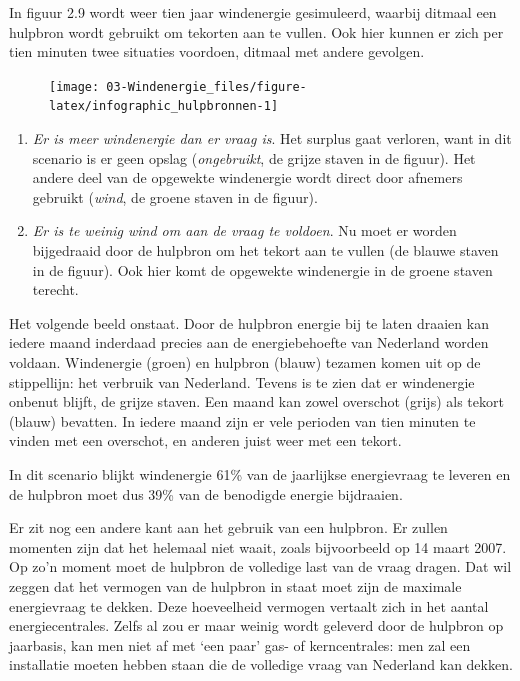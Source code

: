 \documentclass[
  11pt,
  a4paper,
]{book}
\providecommand{\tightlist}{%
  \setlength{\itemsep}{0pt}\setlength{\parskip}{0pt}}
\begin{document}
In figuur 2.9 wordt weer tien jaar windenergie gesimuleerd, waarbij ditmaal een hulpbron wordt gebruikt om tekorten aan te vullen. Ook hier kunnen er zich per tien minuten twee situaties voordoen, ditmaal met andere gevolgen.

\begin{figure}[!t]

{\centering \texttt{[image: 03-Windenergie\_files/figure-latex/infographic\_hulpbronnen-1]} 

}

\end{figure}

\begin{enumerate}
\def\labelenumi{\arabic{enumi}.}
\tightlist
\item
  \emph{Er is meer windenergie dan er vraag is}. Het surplus gaat verloren,
  want in dit scenario is er geen opslag (\emph{ongebruikt}, de grijze staven in de figuur). Het andere
  deel van de opgewekte windenergie wordt direct door afnemers gebruikt (\emph{wind}, de groene staven in de
  figuur).
\item
  \emph{Er is te weinig wind om aan de vraag te voldoen}. Nu moet er worden
  bijgedraaid door de hulpbron om het tekort aan te vullen (de
  blauwe staven in de figuur). Ook hier komt de opgewekte
  windenergie in de groene staven terecht.
\end{enumerate}

\noindent Het volgende beeld onstaat. Door de hulpbron energie bij te laten draaien kan iedere maand inderdaad precies aan de energiebehoefte van Nederland worden voldaan. Windenergie (groen) en hulpbron (blauw) tezamen komen uit op de stippellijn: het verbruik van Nederland. Tevens is te zien dat er windenergie onbenut blijft, de grijze staven. Een maand kan zowel overschot (grijs) als tekort (blauw) bevatten. In iedere maand zijn er vele perioden van tien minuten te vinden met een overschot, en anderen juist weer met een tekort.

In dit scenario blijkt windenergie 61\% van de jaarlijkse energievraag te leveren en de hulpbron moet dus 39\% van de benodigde energie bijdraaien.

Er zit nog een andere kant aan het gebruik van een hulpbron. Er zullen momenten zijn dat het helemaal niet waait, zoals bijvoorbeeld op 14 maart 2007. Op zo'n moment moet de hulpbron de volledige last van de vraag dragen. Dat wil zeggen dat het vermogen van de hulpbron in staat moet zijn de maximale energievraag te dekken. Deze hoeveelheid vermogen vertaalt zich in het aantal energiecentrales. Zelfs al zou er maar weinig wordt geleverd door de hulpbron op jaarbasis, kan men niet af met `een paar' gas- of kerncentrales: men zal een installatie moeten hebben staan die de volledige vraag van Nederland kan dekken.
\end{document}
